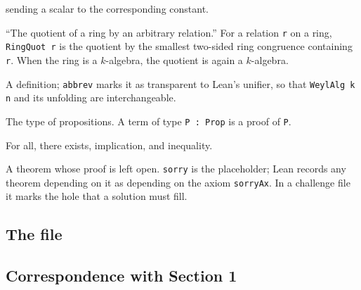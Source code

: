 \documentclass[11pt,a4paper]{article}
\theoremstyle{definition}
\theoremstyle{plain}
\newcommand{\lean}[1]{\texttt{#1}}
\begin{document}
\begin{description}
  sending a scalar to the corresponding constant.
\item[\lean{RingQuot r}] ``The quotient of a ring by an arbitrary relation.''
  For a relation \lean{r} on a ring, \lean{RingQuot r} is the quotient by the
  smallest two-sided ring congruence containing \lean{r}. When the ring is a
  $k$-algebra, the quotient is again a $k$-algebra.
\item[\lean{def}, \lean{abbrev}] A definition; \lean{abbrev} marks it as
  transparent to Lean's unifier, so that \lean{WeylAlg k n} and its unfolding
  are interchangeable.
\item[\lean{Prop}] The type of propositions. A term of type \lean{P : Prop}
  is a proof of \lean{P}.
\item[\lean{∀}, \lean{∃}, \lean{→}, \lean{≠}] For all, there exists,
  implication, and inequality.
\item[\lean{theorem ... := by sorry}] A theorem whose proof is left open.
  \lean{sorry} is the placeholder; Lean records any theorem depending on it as
  depending on the axiom \lean{sorryAx}. In a challenge file it marks the hole
  that a solution must fill.
\end{description}

\subsection{The file}


\subsection{Correspondence with Section 1}
\end{document}
